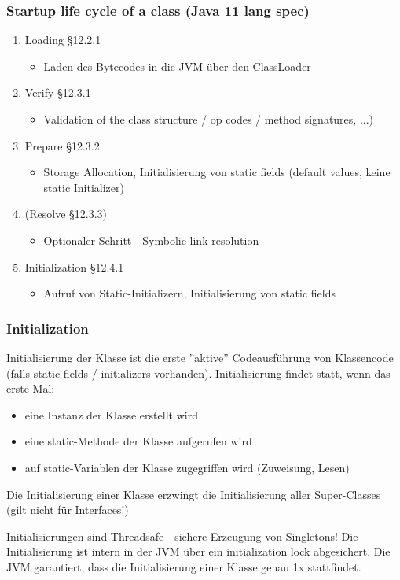 \documentclass[aspectratio=169]{beamer}
\begin{document}
\begin{frame}
	\frametitle{Startup life cycle of a class (Java 11 lang spec)}
	\begin{enumerate}
		\item{Loading §12.2.1}
			\begin{itemize}
				\item{Laden des Bytecodes in die JVM über den ClassLoader}
			\end{itemize}
		\item{Verify §12.3.1}
			\begin{itemize}
				\item{Validation of the class structure / op codes / method signatures, ...)}
			\end{itemize}
		\item{Prepare §12.3.2}
			\begin{itemize}
				\item{Storage Allocation, Initialisierung von static fields (default values, keine static Initializer)}
			\end{itemize}
		\item{(Resolve §12.3.3)}
			\begin{itemize}
				\item{Optionaler Schritt - Symbolic link resolution}
			\end{itemize}
		\item{Initialization §12.4.1}
			\begin{itemize}
				\item{Aufruf von Static-Initializern, Initialisierung von static fields}
			\end{itemize}
	\end{enumerate}
\end{frame}

\begin{frame}
	\frametitle{Initialization}
	Initialisierung der Klasse ist die erste ''aktive'' Codeausführung von Klassencode (falls static fields / initializers vorhanden). Initialisierung findet statt, wenn das erste Mal:
	\begin{itemize}
		\item{eine Instanz der Klasse erstellt wird}
		\item{eine static-Methode der Klasse aufgerufen wird}
		\item{auf static-Variablen der Klasse zugegriffen wird (Zuweisung, Lesen)}
	\end{itemize}

	Die Initialisierung einer Klasse erzwingt die Initialisierung aller Super-Classes (gilt nicht für Interfaces!)
	\pause
	\begin{block}{Initialisierungen sind Threadsafe - sichere Erzeugung von Singletons!}
		Die Initialisierung ist intern in der JVM über ein initialization lock abgesichert. Die JVM garantiert, dass die Initialisierung einer Klasse genau 1x stattfindet. 
	\end{block}
\end{frame}
\end{document}
